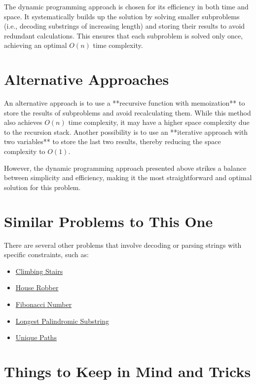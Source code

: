 The dynamic programming approach is chosen for its efficiency in both time and space. It systematically builds up the solution by solving smaller subproblems (i.e., decoding substrings of increasing length) and storing their results to avoid redundant calculations. This ensures that each subproblem is solved only once, achieving an optimal \( O(n) \) time complexity.

\section*{Alternative Approaches}

An alternative approach is to use a **recursive function with memoization** to store the results of subproblems and avoid recalculating them. While this method also achieves \( O(n) \) time complexity, it may have a higher space complexity due to the recursion stack. Another possibility is to use an **iterative approach with two variables** to store the last two results, thereby reducing the space complexity to \( O(1) \).

However, the dynamic programming approach presented above strikes a balance between simplicity and efficiency, making it the most straightforward and optimal solution for this problem.

\section*{Similar Problems to This One}

There are several other problems that involve decoding or parsing strings with specific constraints, such as:

\begin{itemize}
    \item \hyperref[problem:climbing_stairs]{Climbing Stairs}
    \item \hyperref[problem:house_robber]{House Robber}
    \item \hyperref[problem:fibonacci_number]{Fibonacci Number}
    \item \hyperref[problem:longest_palindromic_substring]{Longest Palindromic Substring}
    \item \hyperref[problem:unique_paths]{Unique Paths}
\end{itemize}

\section*{Things to Keep in Mind and Tricks}

